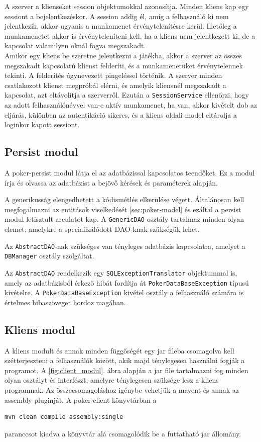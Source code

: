 A szerver a klienseket session objektumokkal azonosítja. Minden kliens kap egy sessiont a bejelentkezéskor. A session addig él, amíg a felhasználó ki nem jelentkezik, akkor ugyanis a munkamenet érvénytelenítésre kerül. Illetőleg a munkamenetet akkor is érvényteleníteni kell, ha a kliens nem jelentkezett ki, de a kapcsolat valamilyen oknál fogva megszakadt. \\
Amikor egy kliens be szeretne jelentkezni a játékba, akkor a szerver az összes megszakadt kapcsolatú klienst felderíti, és a munkamenetüket érvénytelennek tekinti. A felderítés úgynevezett pingeléssel történik. A szerver minden csatlakozott klienst megpróbál elérni, és amelyik kliensnél megszakadt a kapcsolat, azt eltávolítja a szerverről. Ezután a \texttt{SessionService} ellenőrzi, hogy az adott felhasználónévvel van-e aktív munkamenet, ha van, akkor kivételt dob az eljárás, különben az autentikáció sikeres, és a kliens oldali model eltárolja a loginkor kapott sessiont.

\subsection{Persist modul}
A poker-persist modul látja el az adatbázissal kapcsolatos teendőket. Ez a modul írja és olvassa az adatbázist a bejövő kérések és paraméterek alapján.

A generikusság elengedhetett a kódismétlés elkerülése végett. Általánosan kell megfogalmazni az entitások viselkedését \ref{sec:poker-model} és ezáltal a persist modul letisztult arculatot kap. A \texttt{GenericDAO} osztály tartalmaz minden olyan elemet, amelykre a specializálódott DAO-knak szükségük lehet.

Az \texttt{AbstractDAO}-nak szükséges van tényleges adatbázis kapcsolatra, amelyet a \texttt{DBManager} osztály szolgáltat.

Az \texttt{AbstractDAO} rendelkezik egy \texttt{SQLExceptionTranslator} objektummal is, amely az adatbázisból érkező hibát fordítja át \texttt{PokerDataBaseException} típusú kivételre. A \texttt{PokerDataBaseException} kivétel osztály a felhasználó számára is értelmes hibaszöveget hordoz magában.

\subsection{Kliens modul}
A kliens modult és annak minden függőségét egy jar fileba csomagolva kell szétterjeszteni a felhasználók között, akik majd ténylegesen használni fogják a programot. A \ref{fig:client_modul}. ábra alapján a jar file tartalmazni fog minden olyan osztályt és interfészt, amelyre ténylegesen szüksége lesz a kliens programnak. Az összecsomagoláshoz igénybe vehetjük a mavent és annak az assembly pluginját. A poker-client könyvtárban a
 \begin{verbatim}
mvn clean compile assembly:single
\end{verbatim}
paranccsot kiadva a  könyvtár alá csomagolódik be a futtatható jar állomány.

